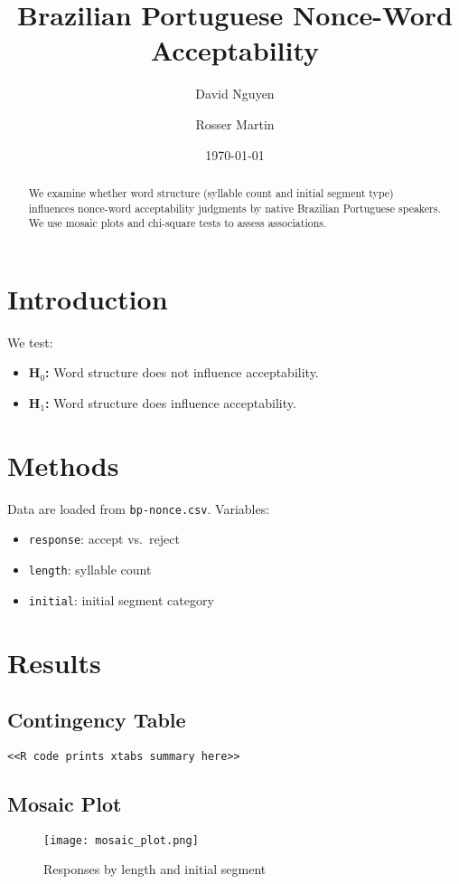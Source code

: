 \documentclass[11pt]{article}
\title{Brazilian Portuguese Nonce-Word Acceptability}
\author{David Nguyen \and Rosser Martin}
\date{\today}
\begin{document}
\maketitle

\begin{abstract}
We examine whether word structure (syllable count and initial segment type) influences nonce-word acceptability judgments by native Brazilian Portuguese speakers. We use mosaic plots and chi-square tests to assess associations.
\end{abstract}

\section{Introduction}
We test:
\begin{itemize}
  \item \textbf{H$_0$:} Word structure does not influence acceptability.
  \item \textbf{H$_1$:} Word structure does influence acceptability.
\end{itemize}

\section{Methods}
Data are loaded from \texttt{bp-nonce.csv}. Variables:
\begin{itemize}
  \item \texttt{response}: accept vs.\ reject
  \item \texttt{length}: syllable count
  \item \texttt{initial}: initial segment category
\end{itemize}

\section{Results}

\subsection{Contingency Table}
\begin{verbatim}
<<R code prints xtabs summary here>>
\end{verbatim}

\subsection{Mosaic Plot}
\begin{figure}[h!]
  \centering
  \texttt{[image: mosaic\_plot.png]}
  \caption{Responses by length and initial segment}
\end{figure}
\end{document}
